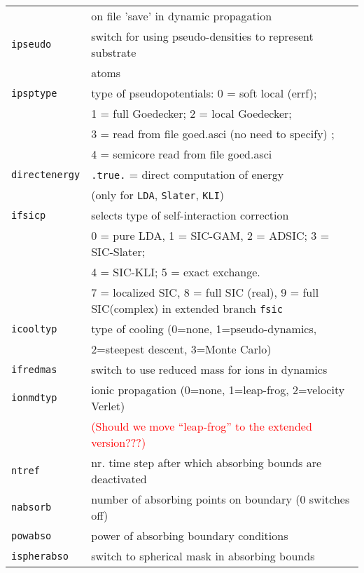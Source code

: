 \documentclass[12pt]{article}
\begin{document}
\begin{tabular}{ll}
{\tt                  }& on file 'save' in dynamic propagation\\
{\tt ipseudo          }& switch for using pseudo-densities to represent substrate\\
{\tt                  }& atoms \\
{\tt ipsptype         }& type of pseudopotentials: 0 = soft local (errf);\\
                       & 1 = full Goedecker; 2 = local Goedecker;\\
                       & 3 = read from file goed.asci (no need to specify)  ;\\
                       & 4 = semicore read from file goed.asci\\
{\tt directenergy}   & {\tt .true.} = direct computation of energy \\
                       & (only for {\tt LDA}, {\tt Slater}, {\tt KLI})\\
{\tt ifsicp           }& selects type of self-interaction correction\\
    &  0 = pure LDA, 1 = SIC-GAM, 2 = ADSIC; 3 = SIC-Slater; \\
    &  4 = SIC-KLI; 5 = exact exchange. \\
    & 7 = localized SIC, 8 = full SIC (real), 9 = full SIC(complex)
     in extended branch {\tt fsic}\\
{\tt icooltyp         }& type of cooling (0=none, 1=pseudo-dynamics,\\
{\tt                  }& 2=steepest descent, 3=Monte Carlo)\\
{\tt ifredmas         }& switch to use reduced mass for ions in dynamics\\
{\tt ionmdtyp         }& ionic propagation
                         (0=none, 1=leap-frog, 2=velocity Verlet)\\
 & \textcolor{red}{(Should we move ``leap-frog'' to the extended version???)}\\
{\tt ntref}& nr. time step after which absorbing bounds are deactivated
\\
{\tt nabsorb}          & number of absorbing points on boundary (0 switches off) 
\\
{\tt powabso}          & power of absorbing boundary conditions
\\
{\tt ispherabso}       & switch to spherical mask in absorbing bounds
\\
\hline
\end{tabular}
\end{document}
